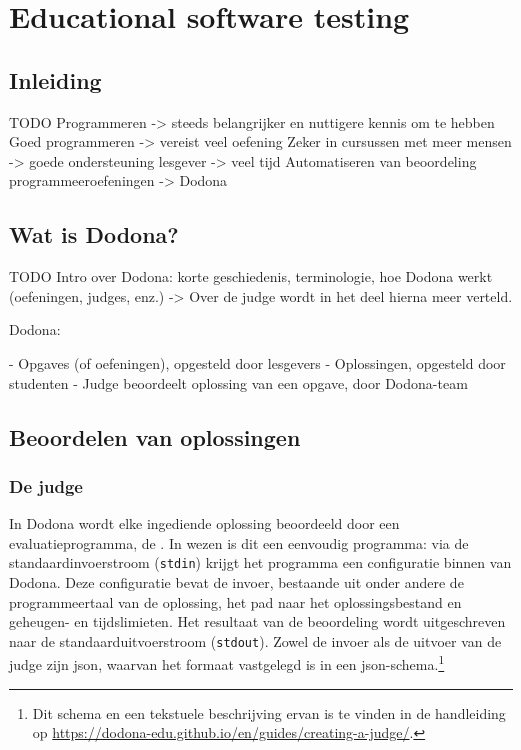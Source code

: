 \chapter{Educational software testing}\label{ch:dodona}

\section{Inleiding}\label{sec:inleiding}

TODO
Programmeren -> steeds belangrijker en nuttigere kennis om te hebben
Goed programmeren -> vereist veel oefening
Zeker in cursussen met meer mensen -> goede ondersteuning lesgever -> veel tijd
Automatiseren van beoordeling programmeeroefeningen -> Dodona

\section{Wat is Dodona?}\label{sec:wat-is-dodona}

TODO
Intro over Dodona: korte geschiedenis, terminologie, hoe Dodona werkt (oefeningen, judges, enz.)
-> Over de judge wordt in het deel hierna meer verteld.

Dodona:

- Opgaves (of oefeningen), opgesteld door lesgevers
- Oplossingen, opgesteld door studenten
- Judge beoordeelt oplossing van een opgave, door Dodona-team

\section{Beoordelen van oplossingen}\label{sec:evalueren-van-een-oplossing}

\subsection{De judge}\label{subsec:de-judge}

In Dodona wordt elke ingediende oplossing beoordeeld door een evaluatieprogramma, de .
In wezen is dit een eenvoudig programma: via de standaardinvoerstroom (\texttt{stdin}) krijgt het programma een configuratie binnen van Dodona.
Deze configuratie bevat de invoer, bestaande uit onder andere de programmeertaal van de oplossing, het pad naar het oplossingsbestand en geheugen- en tijdslimieten.
Het resultaat van de beoordeling wordt uitgeschreven naar de standaarduitvoerstroom (\texttt{stdout}).
Zowel de invoer als de uitvoer van de judge zijn json, waarvan het formaat vastgelegd is in een json-schema.\footnote{Dit schema en een tekstuele beschrijving ervan is te vinden in de handleiding op \url{https://dodona-edu.github.io/en/guides/creating-a-judge/}.}

